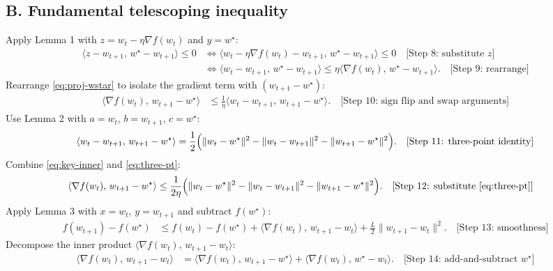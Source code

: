 \documentclass[11pt]{article}
\begin{document}
\subsection*{B. Fundamental telescoping inequality}
Apply Lemma 1 with $z=w_t-\eta\nabla f(w_t)$ and $y=w^\star$:
\begin{align}
\langle z - w_{t+1},\, w^\star - w_{t+1}\rangle \le 0 
&\iff \langle w_t - \eta \nabla f(w_t) - w_{t+1},\, w^\star - w_{t+1}\rangle \le 0 \quad \text{[Step 8: substitute $z$]} \nonumber\\
&\iff \langle w_t - w_{t+1},\, w^\star - w_{t+1}\rangle \le \eta \langle \nabla f(w_t),\, w^\star - w_{t+1}\rangle. \quad \text{[Step 9: rearrange]}
\label{eq:proj-wstar}
\end{align}
Rearrange \eqref{eq:proj-wstar} to isolate the gradient term with $(w_{t+1}-w^\star)$:
\begin{align}
\langle \nabla f(w_t),\, w_{t+1} - w^\star\rangle
&\le \frac{1}{\eta}\langle w_t - w_{t+1},\, w_{t+1} - w^\star\rangle. \quad \text{[Step 10: sign flip and swap arguments]}
\label{eq:key-inner}
\end{align}
Use Lemma 2 with $a=w_t$, $b=w_{t+1}$, $c=w^\star$:
\begin{align}
\langle w_t - w_{t+1},\, w_{t+1} - w^\star\rangle
= \frac12\Bigl(\|w_t - w^\star\|^2 - \|w_t - w_{t+1}\|^2 - \|w_{t+1} - w^\star\|^2\Bigr). \quad \text{[Step 11: three-point identity]}
\label{eq:three-pt}
\end{align}
Combine \eqref{eq:key-inner} and \eqref{eq:three-pt}:
\begin{align}
\langle \nabla f(w_t),\, w_{t+1} - w^\star\rangle
&\le \frac{1}{2\eta}\Bigl(\|w_t - w^\star\|^2 - \|w_t - w_{t+1}\|^2 - \|w_{t+1} - w^\star\|^2\Bigr). \quad \text{[Step 12: substitute \eqref{eq:three-pt}]}
\label{eq:grad-wt1-wstar}
\end{align}
Apply Lemma 3 with $x=w_t$, $y=w_{t+1}$ and subtract $f(w^\star)$:
\begin{align}
f(w_{t+1}) - f(w^\star)
&\le f(w_t) - f(w^\star) + \langle \nabla f(w_t),\, w_{t+1}-w_t\rangle + \frac{L}{2}\|w_{t+1}-w_t\|^2. \quad \text{[Step 13: smoothness]}
\label{eq:descent-gap-raw}
\end{align}
Decompose the inner product $\langle \nabla f(w_t),\, w_{t+1}-w_t\rangle$:
\begin{align}
\langle \nabla f(w_t),\, w_{t+1}-w_t\rangle
&= \langle \nabla f(w_t),\, w_{t+1}-w^\star\rangle + \langle \nabla f(w_t),\, w^\star-w_t\rangle. \quad \text{[Step 14: add-and-subtract $w^\star$]}
\label{eq:split}
\end{align}
\end{document}
